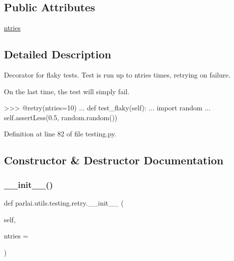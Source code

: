 \subsection*{Public Attributes}
\begin{DoxyCompactItemize}
\item 
\hyperlink{classparlai_1_1utils_1_1testing_1_1retry_abd5233dc28b07a53cd11347e5e44c44f}{ntries}
\end{DoxyCompactItemize}


\subsection{Detailed Description}
\begin{DoxyVerb}Decorator for flaky tests. Test is run up to ntries times, retrying on failure.

On the last time, the test will simply fail.

>>> @retry(ntries=10)
... def test_flaky(self):
...     import random
...     self.assertLess(0.5, random.random())
\end{DoxyVerb}
 

Definition at line 82 of file testing.\+py.



\subsection{Constructor \& Destructor Documentation}
\mbox{\label{classparlai_1_1utils_1_1testing_1_1retry_a35e3eafac8f9ba72092a2a4d1b4c0545}} 
\subsubsection{\texorpdfstring{\+\_\+\+\_\+init\+\_\+\+\_\+()}{\_\_init\_\_()}}
{\footnotesize\ttfamily def parlai.\+utils.\+testing.\+retry.\+\_\+\+\_\+init\+\_\+\+\_\+ (\begin{DoxyParamCaption}\item[{}]{self,  }\item[{}]{ntries = {} }\end{DoxyParamCaption})}



